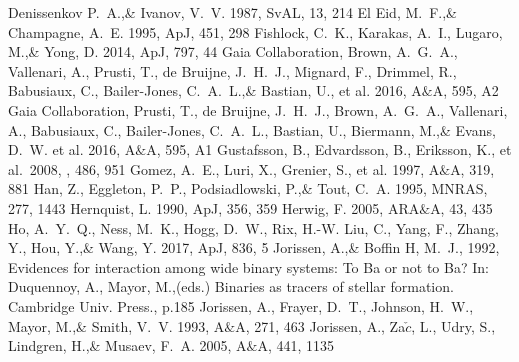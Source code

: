 \documentclass[a4paper,fleqn,usenatbib]{mnras}
\begin{document}
\begin{thebibliography}{99}
Denissenkov P.~A.,\& Ivanov, V.~V. 1987, 
SvAL, 13, 214
El Eid, M.~F.,\& Champagne, A.~E. 1995, 
ApJ, 451, 298
Fishlock, C.~K., Karakas, A.~I., Lugaro, M.,\& Yong, D. 2014, 
ApJ, 797, 44
Gaia Collaboration, Brown, A.~G.~A., Vallenari, A., Prusti, T., de Bruijne, J.~H.~J., Mignard, F., Drimmel, R., Babusiaux, C., Bailer-Jones, C.~A.~L.,\& Bastian, U., et al. 2016, 
A$\&$A, 595, A2
Gaia Collaboration, Prusti, T., de Bruijne, J.~H.~J., Brown, A.~G.~A., Vallenari, A., Babusiaux, C., Bailer-Jones, C.~A.~L., Bastian, U., Biermann, M.,\& Evans, D.~W. et al. 2016, 
A$\&$A, 595, A1
 Gustafsson, B., Edvardsson, B., Eriksson, K., et al.\ 2008, \aap, 486, 951 
Gomez, A.~E., Luri, X., Grenier, S., et al. 1997, 
A$\&$A, 319, 881
Han, Z., Eggleton, P.~P., Podsiadlowski, P.,\& Tout, C.~A. 1995, 
MNRAS, 277, 1443
Hernquist, L. 1990, 
ApJ, 356, 359
Herwig, F. 2005, 
ARA$\&$A, 43, 435
Ho, A.~Y.~Q., Ness, M.~K., Hogg, D.~W., Rix, H.-W. Liu, C., Yang, F., Zhang, Y., Hou, Y.,\& Wang, Y. 2017, 
ApJ, 836, 5
Jorissen, A.,\& Boffin H, M.~J., 1992, 
Evidences for interaction among wide binary systems: To Ba or not to Ba? In: Duquennoy, A., Mayor, M.,(eds.) Binaries as tracers of stellar formation. Cambridge Univ. Press., p.185
Jorissen, A., Frayer, D.~T., Johnson, H.~W., Mayor, M.,\& Smith, V.~V. 1993, 
A$\&$A, 271, 463
Jorissen, A., Za$\check{c}$, L., Udry, S., Lindgren, H.,\& Musaev, F.~A. 2005, 
A$\&$A, 441, 1135

\end{thebibliography}
\end{document}
